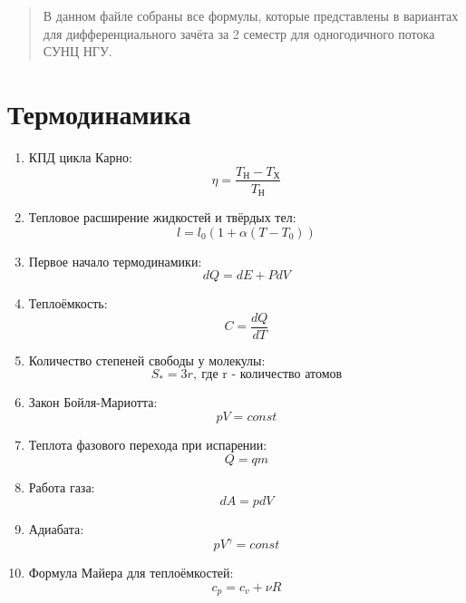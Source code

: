


	\maketitle
	
	\begin{abstract}
		В данном файле собраны все формулы, которые представлены в вариантах для дифференциального зачёта за 2 семестр для одногодичного потока СУНЦ НГУ.
	\end{abstract}
	
	\section{Термодинамика}
	\begin{enumerate}
		\item КПД цикла Карно: \[ \eta = \frac{T_{\text{Н}} - T_{\text{Х}}}{T_{\text{Н}}} \]
		\item Тепловое расширение жидкостей и твёрдых тел: \[ l = l_0 (1 + \alpha (T - T_0)) \]
		\item Первое начало термодинамики: \[ dQ = dE + PdV \]
		\item Теплоёмкость: \[ C = \frac{dQ}{dT} \]
		\item Количество степеней свободы у молекулы: \[ S_{*} = 3r, \ \text{где r - количество атомов} \]
		\item Закон Бойля-Мариотта: \[ pV = const \]
		\item Теплота фазового перехода при испарении: \[ Q = qm \]
		\item Работа газа: \[ dA = pdV \]
		\item Адиабата: \[ pV^{\gamma} = const \]
		\item Формула Майера для теплоёмкостей: \[ c_p = c_v + \nu R \]
		
	\end{enumerate}
	
